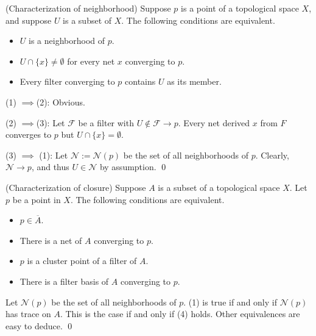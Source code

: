 \documentclass{report}
\begin{document}
\begin{prp} (Characterization of neighborhood)
    Suppose \( p \) is a point of a topological space \( X \), and suppose \( U \) is a subset of \( X \). The following conditions are equivalent.
    \begin{itemize}
        \item[(1)] \( U \) is a neighborhood of \( p \).
        \item[(2)] \( U \cap \{x\} \neq \emptyset \) for every net \( x \) converging to \( p \).
        \item[(3)] Every filter converging to \( p \) contains \( U \) as its member.
    \end{itemize}
\end{prp}
\begin{prf}
    (1) \( \implies \)(2): Obvious.

    (2) \( \implies \)(3):
    Let \( \mathscr{F} \) be a filter with \( U \notin \mathscr{F} \to p \). Every net derived \( x \) from \( F \) converges to \( p \) but \( U \cap \{x\} = \emptyset \).

    (3) \( \implies \) (1): Let \( \mathscr{N}:=\mathscr{N}(p) \) be the set of all neighborhoods of \( p \). Clearly, \( \mathscr{N}\to p \), and thus \( U \in \mathscr{N} \) by assumption.
    \qed\end{prf}

\begin{prp}\label{characterize closure} (Characterization of closure)
    Suppose \( A \) is a subset of a topological space \( X \). Let \( p \) be a point in \( X \). The following conditions are equivalent.
    \begin{itemize}
        \item[(1)] \( p \in \overline{A} \).
        \item[(2)] There is a net of \( A \) converging to \( p \).
        \item[(3)] \( p \) is a cluster point of a filter of \( A \).
        \item[(4)] There is a filter basis of \( A \) converging to \( p \).
    \end{itemize}
\end{prp}
\begin{prf}
    Let \( \mathscr{N}(p) \) be the set of all neighborhoods of \( p \).
    (1) is true if and only if \( \mathscr{N}(p) \) has trace on \( A \). This is the case if and only if (4) holds. Other equivalences are easy to deduce.
    \qed\end{prf}
\end{document}
